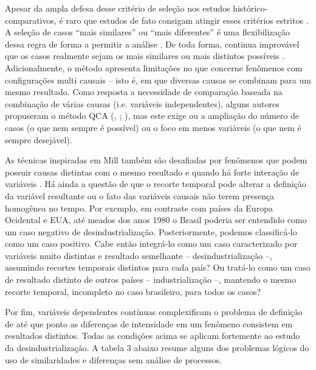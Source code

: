 Apesar da ampla defesa desse critério de seleção nos estudos
histórico-comparativos, é raro que estudos de fato consigam atingir
esses critérios estritos . A seleção de casos
``mais similares'' ou ``mais diferentes'' é uma flexibilização dessa
regra de forma a permitir a análise . De
toda forma, continua improvável que os casos realmente sejam os mais
similares ou mais distintos possíveis .
Adicionalmente, o método apresenta limitações no que concerne fenômenos
com configurações multi causais -- isto é, em que diversas causas se
combinam para um mesmo resultado. Como resposta a necessidade de
comparação baseada na combinação de várias causas (i.e. variáveis
independentes), alguns autores propuseram o método QCA
(\citeauthor{ragin_comparative_2014}, \citeyear{ragin_comparative_2014};
), mas este exige ou a ampliação do número
de casos (o que nem sempre é possível) ou o foco em menos variáveis (o
que nem é sempre desejável).

As técnicas inspiradas em Mill também são desafiadas por fenômenos que
podem possuir causas distintas com o mesmo resultado  e quando há forte interação de variáveis
\citep{mahoney_strategies_2003}. Há ainda a questão de que o recorte
temporal pode alterar a definição da variável resultante ou o fato das
variáveis causais não terem presença homogênea no tempo. Por exemplo, em
contraste com países da Europa Ocidental e EUA, até meados dos anos 1980
o Brasil poderia ser entendido como um caso negativo de
desindustrialização. Posteriormente, podemos classificá-lo como um caso
positivo. Cabe então integrá-lo como um caso caracterizado por variáveis
muito distintas e resultado semelhante -- desindustrialização --,
assumindo recortes temporais distintos para cada país? Ou tratá-lo como
um caso de resultado distinto de outros países -- industrialização --,
mantendo o mesmo recorte temporal, incompleto no caso brasileiro, para
todos os casos?

Por fim, variáveis dependentes contínuas complexificam o problema de
definição de até que ponto as diferenças de intensidade em um fenômeno
consistem em resultados distintos. Todas as condições acima se aplicam
fortemente ao estudo da desindustrialização. A tabela 3 abaixo resume
alguns dos problemas lógicos do uso de similaridades e diferenças sem
análise de processos.

